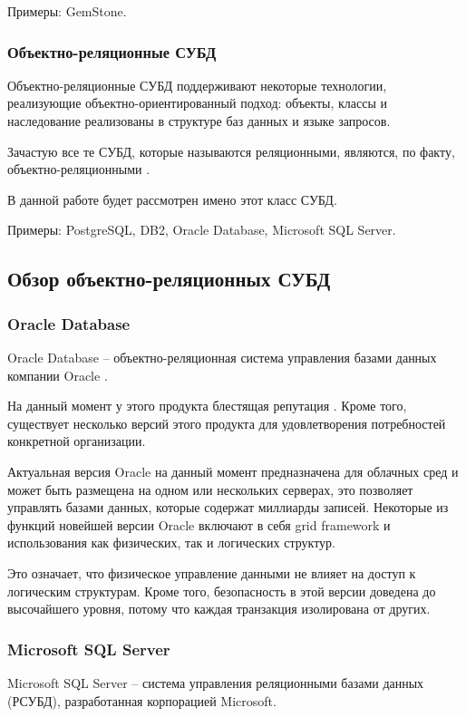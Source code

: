 \documentclass[a4paper,14pt]{extreport}
\begin{document}
Примеры: GemStone.

\subsubsection*{Объектно-реляционные СУБД}
Объектно-реляционные СУБД поддерживают некоторые технологии, реализующие объектно-ориентированный подход: объекты, классы и наследование реализованы в структуре баз данных и языке запросов.

Зачастую все те СУБД, которые называются реляционными, являются, по факту, объектно-реляционными \cite{dbms}.

В данной работе будет рассмотрен имено этот класс СУБД.

Примеры: PostgreSQL, DB2, Oracle Database, Microsoft SQL Server.


\subsection{Обзор объектно-реляционных СУБД}

\subsubsection*{Oracle Database}

Oracle Database \cite{orc_db} -- объектно-реляционная система управления базами данных компании Oracle \cite{orc}.

На данный момент у этого продукта блестящая репутация \cite{cmp_db}. Кроме того, существует несколько версий этого продукта для удовлетворения потребностей конкретной организации.

Актуальная версия Oracle на данный момент предназначена для облачных сред и может быть размещена на одном или нескольких серверах, это позволяет управлять базами данных, которые содержат миллиарды записей. Некоторые из функций новейшей версии Oracle включают в себя grid framework и использования как физических, так и логических структур.

Это означает, что физическое управление данными не влияет на доступ к логическим структурам. Кроме того, безопасность в этой версии доведена до высочайшего уровня, потому что каждая транзакция изолирована от других.

\subsubsection*{Microsoft SQL Server}

Microsoft SQL Server \cite{mssql} -- система управления реляционными базами данных (РСУБД), разработанная корпорацией Microsoft.
\end{document}
